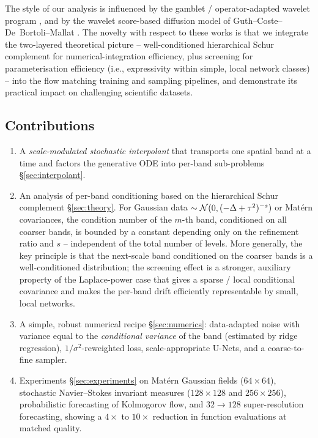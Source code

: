 \documentclass[11pt]{amsart}
\theoremstyle{remark}
\numberwithin{equation}{section}
\begin{document}
The style of our analysis is influenced by the gamblet / operator-adapted wavelet program \cite{chen2021consistency,owhadi2019operator}, and by the wavelet score-based diffusion model of Guth--Coste--De~Bortoli--Mallat \cite{guth2022wavelet}. The novelty with respect to these works is that we integrate the two-layered theoretical picture -- well-conditioned hierarchical Schur complement for numerical-integration efficiency, plus screening for parameterisation efficiency (i.e., expressivity within simple, local network classes) -- into the flow matching training and sampling pipelines, and demonstrate its practical impact on challenging scientific datasets.

\subsection{Contributions}
\begin{enumerate}
\item A \emph{scale-modulated stochastic interpolant} that transports one spatial band at a time and factors the generative ODE into per-band sub-problems \S\ref{sec:interpolant}.
\item An analysis of per-band conditioning based on the hierarchical Schur complement \S\ref{sec:theory}. For Gaussian data $\sim\mathcal{N}(0,(-\Delta+\tau^2)^{-s})$ or Mat\'ern covariances, the condition number of the $m$-th band, conditioned on all coarser bands, is bounded by a constant depending only on the refinement ratio and $s$ -- independent of the total number of levels. More generally, the key principle is that the next-scale band conditioned on the coarser bands is a well-conditioned distribution; the screening effect is a stronger, auxiliary property of the Laplace-power case that gives a sparse / local conditional covariance and makes the per-band drift efficiently representable by small, local networks.
\item A simple, robust numerical recipe \S\ref{sec:numerics}: data-adapted noise with variance equal to the \emph{conditional variance} of the band (estimated by ridge regression), $1/\sigma^2$-reweighted loss, scale-appropriate U-Nets, and a coarse-to-fine sampler.
\item Experiments \S\ref{sec:experiments} on Mat\'ern Gaussian fields ($64\times 64$), stochastic Navier--Stokes invariant measures ($128\times 128$ and $256\times 256$), probabilistic forecasting of Kolmogorov flow, and $32\!\to\!128$ super-resolution forecasting, showing a $4\times$ to $10\times$ reduction in function evaluations at matched quality.
\end{enumerate}
\end{document}
